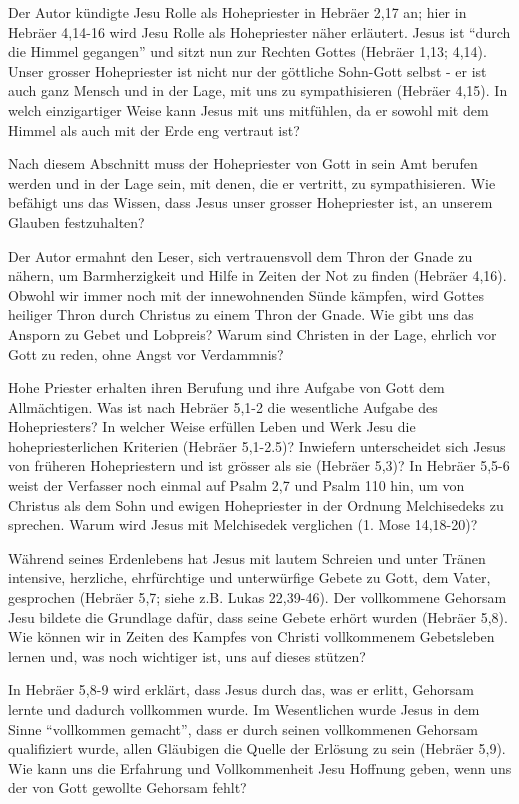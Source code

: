 \documentclass[headsepline=true]{book}
\begin{document}
Der Autor kündigte Jesu Rolle als Hohepriester in Hebräer 2,17 an; hier
in Hebräer 4,14-16 wird Jesu Rolle als Hohepriester näher erläutert.
Jesus ist ``durch die Himmel gegangen'' und sitzt nun zur Rechten Gottes
(Hebräer 1,13; 4,14). Unser grosser Hohepriester ist nicht nur der
göttliche Sohn-Gott selbst - er ist auch ganz Mensch und in der Lage,
mit uns zu sympathisieren (Hebräer 4,15). In welch einzigartiger Weise
kann Jesus mit uns mitfühlen, da er sowohl mit dem Himmel als auch mit
der Erde eng vertraut ist?

Nach diesem Abschnitt muss der Hohepriester von Gott in sein Amt berufen
werden und in der Lage sein, mit denen, die er vertritt, zu
sympathisieren. Wie befähigt uns das Wissen, dass Jesus unser grosser
Hohepriester ist, an unserem Glauben festzuhalten?

Der Autor ermahnt den Leser, sich vertrauensvoll dem Thron der Gnade zu
nähern, um Barmherzigkeit und Hilfe in Zeiten der Not zu finden (Hebräer
4,16). Obwohl wir immer noch mit der innewohnenden Sünde kämpfen, wird
Gottes heiliger Thron durch Christus zu einem Thron der Gnade. Wie gibt
uns das Ansporn zu Gebet und Lobpreis? Warum sind Christen in der Lage,
ehrlich vor Gott zu reden, ohne Angst vor Verdammnis?

Hohe Priester erhalten ihren Berufung und ihre Aufgabe von Gott dem
Allmächtigen. Was ist nach Hebräer 5,1-2 die wesentliche Aufgabe des
Hohepriesters? In welcher Weise erfüllen Leben und Werk Jesu die
hohepriesterlichen Kriterien (Hebräer 5,1-2.5)? Inwiefern unterscheidet
sich Jesus von früheren Hohepriestern und ist grösser als sie (Hebräer
5,3)? In Hebräer 5,5-6 weist der Verfasser noch einmal auf Psalm 2,7 und
Psalm 110 hin, um von Christus als dem Sohn und ewigen Hohepriester in
der Ordnung Melchisedeks zu sprechen. Warum wird Jesus mit Melchisedek
verglichen (1. Mose 14,18-20)?

Während seines Erdenlebens hat Jesus mit lautem Schreien und unter
Tränen intensive, herzliche, ehrfürchtige und unterwürfige Gebete zu
Gott, dem Vater, gesprochen (Hebräer 5,7; siehe z.B. Lukas 22,39-46).
Der vollkommene Gehorsam Jesu bildete die Grundlage dafür, dass seine
Gebete erhört wurden (Hebräer 5,8). Wie können wir in Zeiten des Kampfes
von Christi vollkommenem Gebetsleben lernen und, was noch wichtiger ist,
uns auf dieses stützen?

In Hebräer 5,8-9 wird erklärt, dass Jesus durch das, was er erlitt,
Gehorsam lernte und dadurch vollkommen wurde. Im Wesentlichen wurde
Jesus in dem Sinne ``vollkommen gemacht'', dass er durch seinen
vollkommenen Gehorsam qualifiziert wurde, allen Gläubigen die Quelle der
Erlösung zu sein (Hebräer 5,9). Wie kann uns die Erfahrung und
Vollkommenheit Jesu Hoffnung geben, wenn uns der von Gott gewollte
Gehorsam fehlt?
\end{document}
